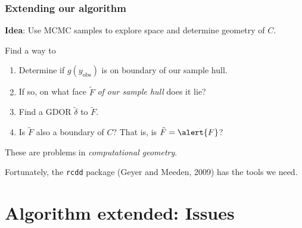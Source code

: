 \documentclass[ 10pt]{beamer}
\newcommand{\yobs}{y_{\text{obs}}}
\begin{document}
\frame
{
\frametitle{Extending our algorithm}  

\textbf{Idea}: Use MCMC samples to explore space and
determine geometry of $C$.
%

\vspace{2mm}
\pause

Find a way to
\begin{enumerate}
\item Determine if $g(\yobs)$ is on boundary of our sample hull.
\vspace{2mm}
\pause
\item If so, on what face $\tilde{F}$ \emph{of our sample hull} does it lie?
\vspace{2mm}
\pause
\item Find a GDOR $\tilde{\delta}$ to $\tilde{F}$.   
\vspace{2mm}
\pause
\item Is $\tilde{F}$ also a boundary of $C$?  That is, is $\tilde{F} = \alert{F}$?
\end{enumerate}

\vspace{4mm}
\pause
These are problems in \emph{computational geometry}.  
\vspace{1mm}

Fortunately, the \texttt{rcdd} package (Geyer and Meeden, 2009) has the 
tools we need.

}

\section{Algorithm extended: Issues}
\end{document}
